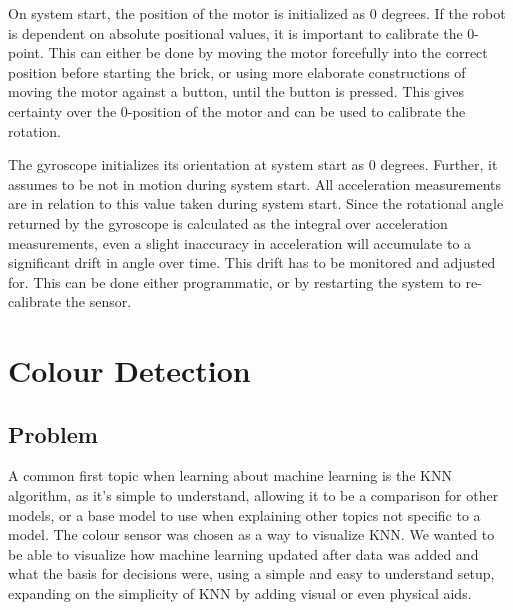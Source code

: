 \documentclass[11pt, a4paper]{article}
\begin{document}
On system start, the position of the motor is initialized as 0 degrees. If the robot is dependent on absolute positional values, it is important to calibrate the 0-point. This can either be done by moving the motor forcefully into the correct position before starting the brick, or using more elaborate constructions of moving the motor against a button, until the button is pressed. This gives certainty over the 0-position of the motor and can be used to calibrate the rotation.

The gyroscope initializes its orientation at system start as 0 degrees. Further, it assumes to be not in motion during system start. All acceleration measurements are in relation to this value taken during system start. Since the rotational angle returned by the gyroscope is calculated as the integral over acceleration measurements, even a slight inaccuracy in acceleration will accumulate to a significant drift in angle over time. This drift has to be monitored and adjusted for. This can be done either programmatic, or by restarting the system to re-calibrate the sensor.

\pagebreak
\section{Colour Detection}
\subsection{Problem}
A common first topic when learning about machine learning is the KNN algorithm, as it's simple to understand, allowing it to be a comparison for other models, or a base model to use when explaining other topics not specific to a model.
The colour sensor was chosen as a way to visualize KNN. We wanted to be able to visualize how machine learning updated after data was added and what the basis for decisions were, using a simple and easy to understand setup, expanding on the simplicity of KNN by adding visual or even physical aids.
\end{document}
